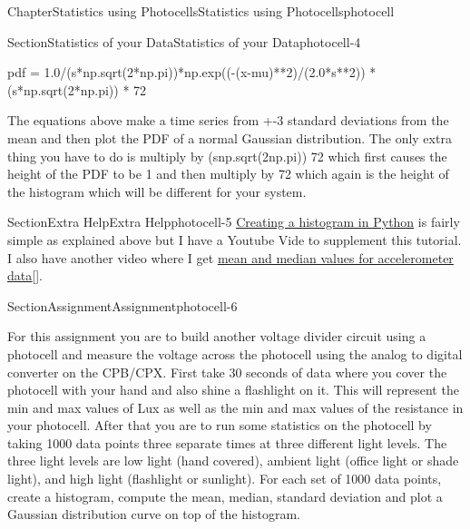 \documentclass[oneside,10pt,]{book}
\newcommand{\xreffont}{\relax}
\newcommand{\linkhilite}[1]{\underline{#1}}
\numberwithin{equation}{section}
\begin{document}
\begin{chapterptx}{Chapter}{Statistics using Photocells}{}{Statistics using Photocells}{}{}{photocell}
\begin{sectionptx}{Section}{Statistics of your Data}{}{Statistics of your Data}{}{}{photocell-4}
\begin{preformatted}
pdf = 1.0/(s*np.sqrt(2*np.pi))*np.exp((-(x-mu)**2)/(2.0*s**2)) * (s*np.sqrt(2*np.pi)) * 72
\end{preformatted}
The equations above make a time series from +-3 standard deviations from the mean and then plot the PDF of a normal Gaussian distribution. The only extra thing you have to do is multiply by (s\textasteriskcentered{}np.sqrt(2\textasteriskcentered{}np.pi)) \textasteriskcentered{} 72 which first causes the height of the PDF to be 1 and then multiply by 72 which again is the height of the histogram which will be different for your system.%
\end{sectionptx}
%
%
\typeout{************************************************}
\typeout{************************************************}
%
\begin{sectionptx}{Section}{Extra Help}{}{Extra Help}{}{}{photocell-5}
\href{https://www.youtube.com/watch?v=bfeJfAWTqzY\&list=PL_D7_GvGz-v1RsDs_OdNW65qRjEjmpfQx\&index=22\&t=0s}{\linkhilite{Creating a histogram in Python}} is fairly simple as explained above but I have a Youtube Vide to supplement this tutorial. I also have another video where I get \href{https://www.youtube.com/watch?v=e4xs9Ky7_YI\&list=PL_D7_GvGz-v1RsDs_OdNW65qRjEjmpfQx\&index=20\&t=0s}{\linkhilite{mean and median values for accelerometer data}}\hyperlink{youtube}{\linkhilite{[{\xreffont 50}]}}.%
\end{sectionptx}
%
%
\typeout{************************************************}
\typeout{************************************************}
%
\begin{sectionptx}{Section}{Assignment}{}{Assignment}{}{}{photocell-6}
\begin{introduction}{}%
For this assignment you are to build another voltage divider circuit using a photocell and measure the voltage across the photocell using the analog to digital converter on the CPB\slash{}CPX. First take 30 seconds of data where you cover the photocell with your hand and also shine a flashlight on it. This will represent the min and max values of Lux as well as the min and max values of the resistance in your photocell. After that you are to run some statistics on the photocell by taking 1000 data points three separate times at three different light levels. The three light levels are low light (hand covered), ambient light (office light or shade light), and high light (flashlight or sunlight). For each set of 1000 data points, create a histogram, compute the mean, median, standard deviation and plot a Gaussian distribution curve on top of the histogram.%

\end{introduction}
\end{sectionptx}
\end{chapterptx}
\end{document}
